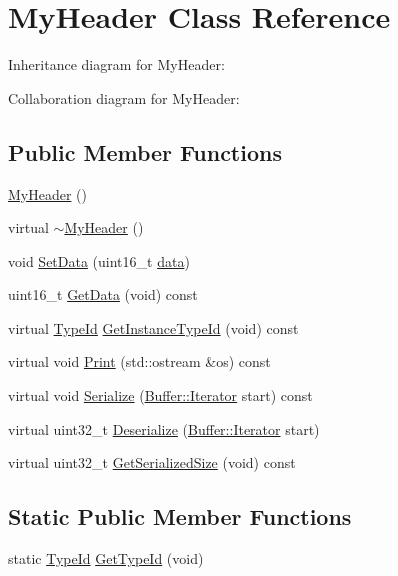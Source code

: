 \hypertarget{classMyHeader}{}\section{My\+Header Class Reference}
\label{classMyHeader}


Inheritance diagram for My\+Header\+:


Collaboration diagram for My\+Header\+:
\subsection*{Public Member Functions}
\begin{DoxyCompactItemize}
\item 
\hyperlink{classMyHeader_a5e495ab05c109b1e596936cceabf7048}{My\+Header} ()
\item 
virtual \hyperlink{classMyHeader_a8bf5c38ade8f9f8c07cbacdb808b6ee2}{$\sim$\+My\+Header} ()
\item 
void \hyperlink{classMyHeader_ad431310f2204f150d75717882c2bdb84}{Set\+Data} (uint16\+\_\+t \hyperlink{topology-example-sim_8cc_a26c65296e316af77b787dc77469bb2a4}{data})
\item 
uint16\+\_\+t \hyperlink{classMyHeader_a84ce206ec1d4c56b0a42b2ae37d74724}{Get\+Data} (void) const 
\item 
virtual \hyperlink{classns3_1_1TypeId}{Type\+Id} \hyperlink{classMyHeader_a243236ce86e1a2079f507e0cc07018a4}{Get\+Instance\+Type\+Id} (void) const 
\item 
virtual void \hyperlink{classMyHeader_a92aa779c069cafbe408eef00552665dd}{Print} (std\+::ostream \&os) const 
\item 
virtual void \hyperlink{classMyHeader_a975a619818e321e1950a2a541162b56c}{Serialize} (\hyperlink{classns3_1_1Buffer_1_1Iterator}{Buffer\+::\+Iterator} start) const 
\item 
virtual uint32\+\_\+t \hyperlink{classMyHeader_a3db2ab4d7df58086335c0d637bc649ef}{Deserialize} (\hyperlink{classns3_1_1Buffer_1_1Iterator}{Buffer\+::\+Iterator} start)
\item 
virtual uint32\+\_\+t \hyperlink{classMyHeader_aa270edbfeaa8e17bd2042e770a13f802}{Get\+Serialized\+Size} (void) const 
\end{DoxyCompactItemize}
\subsection*{Static Public Member Functions}
\begin{DoxyCompactItemize}
\item 
static \hyperlink{classns3_1_1TypeId}{Type\+Id} \hyperlink{classMyHeader_a1ccf706f70c2de32bc5e4905a27c945d}{Get\+Type\+Id} (void)
\end{DoxyCompactItemize}
